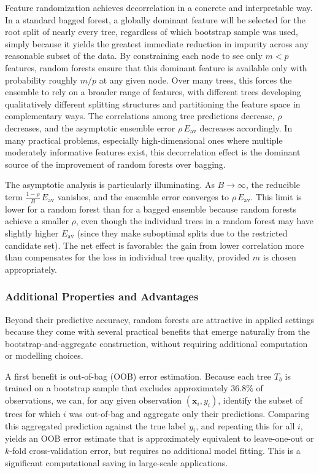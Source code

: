 Feature randomization achieves decorrelation in a concrete and interpretable way. In a standard bagged forest, a globally dominant feature will be selected for the root split of nearly every tree, regardless of which bootstrap sample was used, simply because it yields the greatest immediate reduction in impurity across any reasonable subset of the data. By constraining each node to see only $m < p$ features, random forests ensure that this dominant feature is available only with probability roughly $m/p$ at any given node. Over many trees, this forces the ensemble to rely on a broader range of features, with different trees developing qualitatively different splitting structures and partitioning the feature space in complementary ways. The correlations among tree predictions decrease, $\rho$ decreases, and the asymptotic ensemble error $\rho\,E_{\mathrm{av}}$ decreases accordingly. In many practical problems, especially high-dimensional ones where multiple moderately informative features exist, this decorrelation effect is the dominant source of the improvement of random forests over bagging.

The asymptotic analysis is particularly illuminating. As $B \to \infty$, the reducible term $\frac{1-\rho}{B}\,E_{\mathrm{av}}$ vanishes, and the ensemble error converges to $\rho\,E_{\mathrm{av}}$. This limit is lower for a random forest than for a bagged ensemble because random forests achieve a smaller $\rho$, even though the individual trees in a random forest may have slightly higher $E_{\mathrm{av}}$ (since they make suboptimal splits due to the restricted candidate set). The net effect is favorable: the gain from lower correlation more than compensates for the loss in individual tree quality, provided $m$ is chosen appropriately.

\subsubsection*{Additional Properties and Advantages}

Beyond their predictive accuracy, random forests are attractive in applied settings because they come with several practical benefits that emerge naturally from the bootstrap-and-aggregate construction, without requiring additional computation or modelling choices.

A first benefit is \alert{out-of-bag (OOB) error estimation}. Because each tree $T_b$ is trained on a bootstrap sample that excludes approximately $36.8\%$ of observations, we can, for any given observation $(\mathbf{x}_i, y_i)$, identify the subset of trees for which $i$ was out-of-bag and aggregate only their predictions. Comparing this aggregated prediction against the true label $y_i$, and repeating this for all $i$, yields an OOB error estimate that is approximately equivalent to leave-one-out or $k$-fold cross-validation error, but requires no additional model fitting. This is a significant computational saving in large-scale applications.

